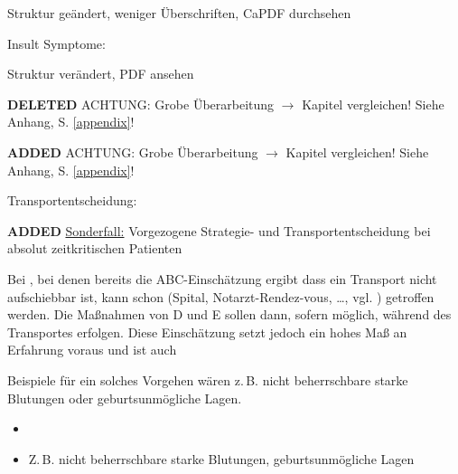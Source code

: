 \documentclass[
ngerman,
paper=a4,
asymmetric,
fontsize=10pt,
headings=small,
draft=false,
numbers=noenddot,
bibtotocnumbered,
footnotes=multiple,
]{scrreprt}
\newcommand{\jALT}{{\color{red}\sffamily\textbf{DELETED}\hrulefill\newline\newline}}
\newcommand{\jALTende}{\newline{\color{red}\rule{\linewidth}{2pt}\newline}}
\newcommand{\jNEU}{{\color{green}\sffamily\textbf{ADDED}\hrulefill\newline\newline}}
\newcommand{\jNEUende}{\newline{\color{green}\rule{\linewidth}{3pt}\newline}}
\begin{document}
\begin{enumerate}
{

\item Struktur geändert, weniger Überschriften, Ca{PDF durchsehen}



\item Insult Symptome:

      
      


\item Struktur verändert, PDF ansehen

\jALT
ACHTUNG: Grobe Überarbeitung $\to$ Kapitel vergleichen! Siehe Anhang, S.
\ref{appendix}!
\jALTende

\jNEU
ACHTUNG: Grobe Überarbeitung $\to$ Kapitel vergleichen! Siehe Anhang, S.
\ref{appendix}!
\jNEUende

\item Transportentscheidung:

\jNEU
\TextSlide
{\underline{Sonderfall:} Vorgezogene Strategie- und 
Transportentscheidung bei absolut zeitkritischen Patienten}
{%
Bei , bei denen bereits
die ABC-Einschätzung ergibt dass ein Transport nicht
aufschiebbar ist, kann schon  (Spital,
Notarzt-Rendez-vous, \ldots, vgl.
) getroffen werden.
Die Maßnahmen von D und E sollen dann, sofern möglich,
während des Transportes erfolgen.
Diese Einschätzung setzt jedoch ein hohes Maß an Erfahrung
voraus und ist auch

Beispiele für ein solches Vorgehen wären z.\,B. nicht
beherrschbare starke Blutungen oder geburtsunmögliche Lagen.}
{
\begin{itemize}
  \item {}
  \item Z.\,B. nicht beherrschbare starke 
  Blutungen, geburtsunmögliche Lagen
\end{itemize}
}
{}
{}
{}
\jNEUende

}
\end{enumerate}
\end{document}
